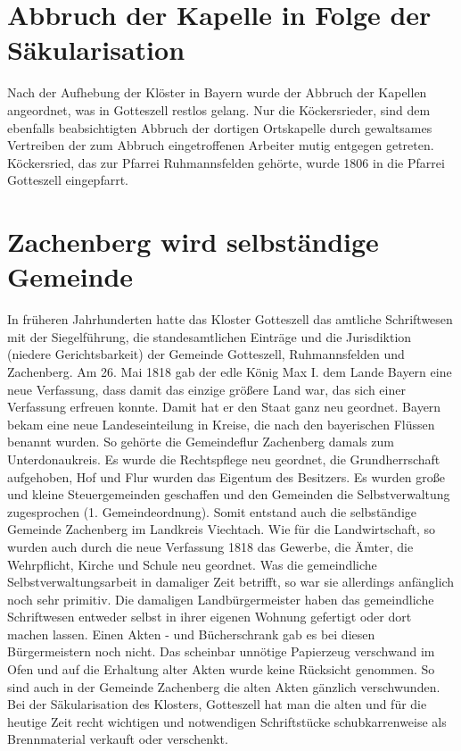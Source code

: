\documentclass[12pt,a4pager]{book}
\begin{document}
\section{Abbruch der Kapelle in Folge der Säkularisation}

Nach der Aufhebung der Klöster in Bayern wurde der Abbruch der Kapellen
angeordnet, was in Gotteszell restlos gelang. Nur die Köckersrieder, sind dem
ebenfalls beabsichtigten Abbruch der dortigen Ortskapelle durch gewaltsames
Vertreiben der zum Abbruch eingetroffenen Arbeiter mutig entgegen getreten.
Köckersried, das zur Pfarrei Ruhmannsfelden gehörte, wurde 1806 in die Pfarrei
Gotteszell eingepfarrt.

\section{Zachenberg wird selbständige Gemeinde}

In früheren Jahrhunderten hatte das Kloster Gotteszell das amtliche Schriftwesen
mit der Siegelführung, die standesamtlichen Einträge und die Jurisdiktion
(niedere Gerichtsbarkeit) der Gemeinde Gotteszell, Ruhmannsfelden und
Zachenberg. Am 26. Mai 1818 gab der edle König Max I. dem Lande Bayern eine neue
Verfassung, dass damit das einzige größere Land war, das sich einer Verfassung
erfreuen konnte. Damit hat er den Staat ganz neu geordnet. Bayern bekam eine
neue Landeseinteilung in Kreise, die nach den bayerischen Flüssen benannt
wurden. So gehörte die Gemeindeflur Zachenberg damals zum Unterdonaukreis. Es
wurde die Rechtspflege neu geordnet, die Grundherrschaft aufgehoben, Hof und
Flur wurden das Eigentum des Besitzers. Es wurden große und kleine
Steuergemeinden geschaffen und den Gemeinden die Selbstverwaltung zugesprochen
(1. Gemeindeordnung). Somit entstand auch die selbständige Gemeinde Zachenberg
im Landkreis Viechtach. Wie für die Landwirtschaft, so wurden auch durch die
neue Verfassung 1818 das Gewerbe, die Ämter, die Wehrpflicht, Kirche und Schule
neu geordnet. Was die gemeindliche Selbstverwaltungsarbeit in damaliger Zeit
betrifft, so war sie allerdings anfänglich noch sehr primitiv. Die damaligen
Landbürgermeister haben das gemeindliche Schriftwesen entweder selbst in ihrer
eigenen Wohnung gefertigt oder dort machen lassen. Einen Akten - und
Bücherschrank gab es bei diesen Bürgermeistern noch nicht. Das scheinbar
unnötige Papierzeug verschwand im Ofen und auf die Erhaltung alter Akten wurde
keine Rücksicht genommen. So sind auch in der Gemeinde Zachenberg die alten
Akten gänzlich verschwunden. Bei der Säkularisation des Klosters, Gotteszell hat
man die alten und für die heutige Zeit recht wichtigen und notwendigen
Schriftstücke schubkarrenweise als Brennmaterial verkauft oder verschenkt.
\end{document}
